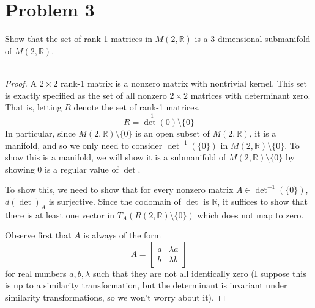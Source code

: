 \documentclass[fontsize=11pt]{scrartcl} %
\numberwithin{equation}{section} %
\numberwithin{figure}{section} %
\numberwithin{table}{section} %
\newcommand{\R}{\mathbb{R}}
\begin{document}
\section*{Problem 3}
Show that the set of rank 1 matrices in $M(2,\R)$ is a 3-dimensional submanifold
of $M(2,\R)$.
\\
\\
\begin{proof}
    A $2\times 2$ rank-1 matrix is a nonzero matrix with nontrivial kernel. This
    set is exactly specified as the set of all nonzero $2\times 2$ matrices with
    determinant zero. That is, letting $R$ denote the set of rank-1 matrices,
    \[
        R = {\det}^{-1}(0)\setminus \{0\}
    \]
    In particular, since $M(2,\R)\setminus\{0\}$ is an open subset of $M(2,\R)$,
    it is a manifold, and so we only need to consider ${\det}^{-1}(\{0\})$ in
    $M(2,\R)\setminus\{0\}$. To show this is a manifold, we will show it is a
    submanifold of $M(2,\R)\setminus\{0\}$ by showing $0$ is a regular value of
    $\det$.

    To show this, we need to show that for every nonzero matrix
    $A\in{\det}^{-1}(\{0\})$, $d(\det)_A$ is surjective. Since the codomain of
    $\det$ is $\R$, it suffices to show that there is at least one vector in
    $T_A(R(2,\R)\setminus\{0\})$ which does not map to zero.

    Observe first that $A$ is always of the form
    \[
        A =
        \begin{bmatrix}
            a &\lambda a\\
            b &\lambda b
        \end{bmatrix}
    \]
    for real numbers $a,b,\lambda$ such that they are not all identically zero
    (I suppose this is up to a similarity transformation, but the determinant is
    invariant under similarity transformations, so we won't worry about it).


\end{proof}
\end{document}
